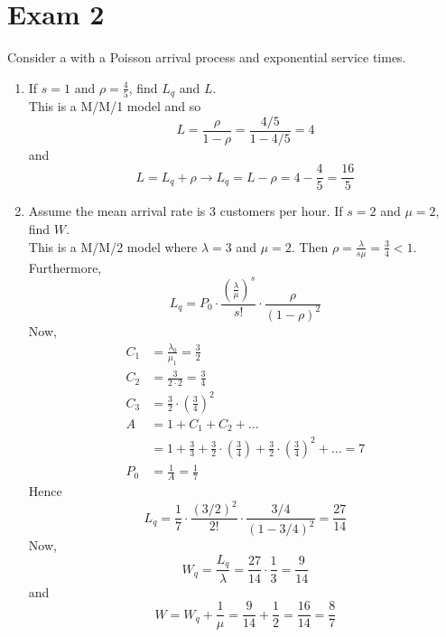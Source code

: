 \documentclass[12pt]{article}
\begin{document}
\section{Exam 2} 
\begin{question} Consider a \qs with a Poisson arrival process and exponential service times. 
\begin{enumerate} 
\item If $s=1$ and $\rho = \frac{4}{5}$, find $L_q$ and $L$. \\ This is a M/M/1 model and so $$ L = \frac{\rho}{1-\rho} = \frac{4/5}{1 - 4/5} = 4 $$ 
and $$ L = L_q + \rho \to L_q = L - \rho = 4 - \frac{4}{5} = \frac{16}{5} $$ 
\item Assume the mean arrival rate is $3$ customers per hour. If $s=2$ and $\mu = 2$, find $W$. \\
This is a M/M/2 model where $\lambda = 3$ and $\mu = 2$. Then $\rho = \frac{\lambda}{s\mu} = \frac{3}{4} < 1$. Furthermore, $$ L_q = P_0 \cdot \frac{ (\frac{\lambda}{\mu})^s}{s!} \cdot \frac{\rho}{(1-\rho)^2} $$
Now, $$ \begin{aligned} C_1 &= \frac{\lambda_0}{\mu_1} = \frac{3}{2} \\ C_2 &= \frac{3}{2\cdot 2} = \frac{3}{4} \\ C_3 &= \frac{3}{2} \cdot (\frac{3}{4})^2 \\ A &= 1 + C_1 + C_2 + \dots \\ &= 1 + \frac{3}{3} + \frac{3}{2} \cdot (\frac{3}{4}) + \frac{3}{2} \cdot (\frac{3}{4})^2 + \dots = 7 \\ P_0 &= \frac{1}{A} = \frac{1}{7} \end{aligned} $$
Hence $$L_q = \frac{1}{7} \cdot \frac{(3/2)^2}{2!} \cdot \frac{3/4}{(1-3/4)^2} = \frac{27}{14} $$ 
Now, $$W_q = \frac{L_q}{\lambda} = \frac{27}{14} \cdot \frac{1}{3} = \frac{9}{14} $$ and $$ W = W_q + \frac{1}{\mu} = \frac{9}{14} + \frac{1}{2} = \frac{16}{14} = \frac{8}{7} $$ 
\end{enumerate} 
\end{question} 
\end{document}
